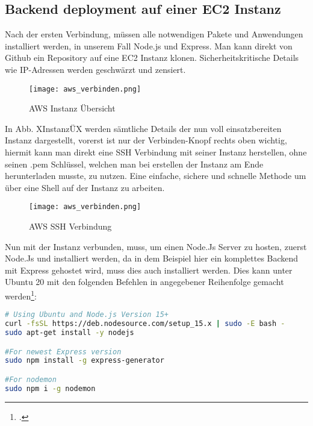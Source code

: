 \subsection{Backend deployment auf einer EC2 Instanz}
Nach der ersten Verbindung, müssen alle notwendigen Pakete und Anwendungen installiert werden, in unserem Fall Node.js und Express. Man kann direkt von Github ein Repository auf eine EC2 Instanz klonen. Sicherheitskritische Details wie IP-Adressen werden geschwärzt und zensiert.

\begin{center}
\begin{figure}[h]
    \centering
    \texttt{[image: aws\_verbinden.png]}
    \caption{AWS Instanz Übersicht}
\end{figure}
\end{center}

In Abb. XInstanzÜX werden sämtliche Details der nun voll einsatzbereiten Instanz dargestellt, vorerst ist nur der Verbinden-Knopf rechts oben wichtig, hiermit kann man direkt eine SSH Verbindung mit seiner Instanz herstellen, ohne seinen .pem Schlüssel, welchen man bei erstellen der Instanz am Ende herunterladen musste, zu nutzen. Eine einfache, sichere und schnelle Methode um über eine Shell auf der Instanz zu arbeiten.

\begin{center}
\begin{figure}[h]
    \centering
    \texttt{[image: aws\_verbinden.png]}
    \caption{AWS SSH Verbindung}
\end{figure}
\end{center}

Nun mit der Instanz verbunden, muss, um einen Node.Js Server zu hosten, zuerst Node.Js und installiert werden, da in dem Beispiel hier ein komplettes Backend mit Express gehostet wird, muss dies auch installiert werden. Dies kann unter Ubuntu 20 mit den folgenden Befehlen in angegebener Reihenfolge gemacht werden\footcite{deploy-nodejs1}:

\begin{lstlisting}[language=bash]
# Using Ubuntu and Node.js Version 15+
curl -fsSL https://deb.nodesource.com/setup_15.x | sudo -E bash -
sudo apt-get install -y nodejs

#For newest Express version
sudo npm install -g express-generator

#For nodemon
sudo npm i -g nodemon
\end{lstlisting}

